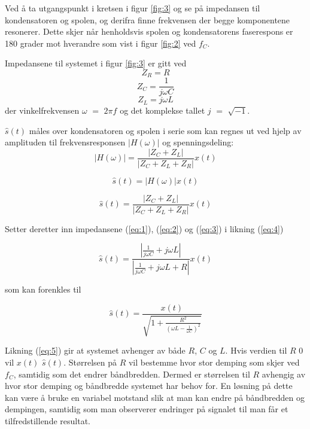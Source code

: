 \documentclass[a4paper,11pt,norsk]{article}
\begin{document}
Ved å ta utgangspunkt i kretsen i figur \ref{fig:3} og se på impedansen til kondensatoren og spolen, og derifra finne frekvensen der begge komponentene resonerer. Dette skjer når henholdsvis spolen og kondensatorens faserespons er 180 grader mot hverandre som vist i figur \ref{fig:2} ved $f_C$.

Impedansene til systemet i figur \ref{fig:3} er gitt ved
\begin{equation}
Z_R = R
\label{eq:1}
\end{equation}
\begin{equation}
Z_C = \frac{1}{j\omega C} 
\label{eq:2}
\end{equation}
\begin{equation}
Z_L = j\omega L
\label{eq:3}
\end{equation}
der vinkelfrekvensen $\omega$ $=$ $2\pi f$ og det komplekse tallet $j$ $=$ $\sqrt{-1}$. 

$\hat{s}(t)$ måles over kondensatoren og spolen i serie som kan regnes ut ved hjelp av amplituden til frekvensresponsen $|H(\omega)|$ og spenningsdeling:
\begin{equation}
    |H(\omega)|=\frac{|Z_C + Z_L|}{|Z_C+Z_L+Z_R|}x(t)
\end{equation}

\begin{equation}
    \hat{s}(t) = |H(\omega)|x(t)
\end{equation}

\begin{equation}
    \hat{s}(t) = \frac{|Z_C + Z_L|}{|Z_C+Z_L+Z_R|}x(t)
    \label{eq:4}
\end{equation}

Setter deretter inn impedansene (\ref{eq:1}), (\ref{eq:2}) og (\ref{eq:3}) i likning (\ref{eq:4})

\begin{equation}
    \hat{s}(t) = \frac{|\frac{1}{j\omega C} + j\omega L|}{|\frac{1}{j\omega C}+j\omega L+R|}x(t)
\end{equation}

som kan forenkles til

\begin{equation}
    \hat{s}(t) = \frac{x(t)}{\sqrt{1+\frac{R^2}{(\omega L - \frac{1}{\omega C})^2}}}
    \label{eq:5}
\end{equation}

Likning (\ref{eq:5}) gir at systemet avhenger av både $R$, $C$ og $L$. Hvis verdien til $R$ \xrightarrow $0$ vil $x(t)$ \xrightarrow $\hat{s}(t)$. Størrelsen på $R$ vil bestemme hvor stor demping som skjer ved $f_C$, samtidig som det endrer båndbredden. Dermed er størrelsen til $R$ avhengig av hvor stor demping og båndbredde systemet har behov for. En løsning på dette kan være å bruke en variabel motstand slik at man kan endre på båndbredden og dempingen, samtidig som man observerer endringer på signalet til man får et tilfredstillende resultat. 
\end{document}
